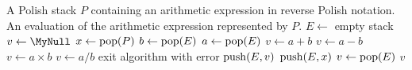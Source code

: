 
\begin{algorithmic}[1]
\Require A Polish stack $P$ containing an arithmetic expression in
  reverse Polish notation.
\Ensure An evaluation of the arithmetic expression represented by $P$.
\State $E \gets$ empty stack
\State $v \gets \MyNull$
  \State $x \gets \operatorname*{pop}(P)$
    \State $b \gets \operatorname*{pop}(E)$
    \State $a \gets \operatorname*{pop}(E)$
      \State $v \gets a + b$
      \State $v \gets a - b$
      \State $v \gets a \times b$
      \State $v \gets a / b$
    \Else
      \State exit algorithm with error
    \EndIf
    \State $\operatorname*{push}(E, v)$
  \Else
    \State $\operatorname*{push}(E, x)$
  \EndIf
\EndWhile
\State $v \gets \operatorname*{pop}(E)$
\State \Return $v$
\end{algorithmic}
